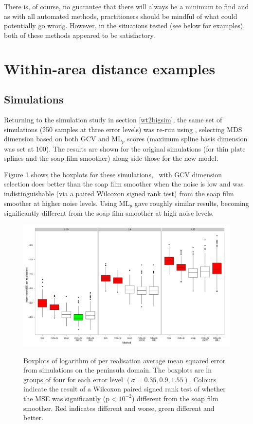 There is, of course, no guarantee that there will always be a minimum to find and as with all automated methods, practitioners should be mindful of what could potentially go wrong. However, in the situations tested (see below for examples), both of these methods appeared to be satisfactory.

\section{Within-area distance examples}
\label{gds-wad-examples}
\subsection{Simulations}

Returning to the simulation study in section \ref{wt2bigsim}, the same set of simulations (250 samples at three error levels) was re-run using \mdsds, selecting MDS dimension based on both GCV and $\text{ML}_p$ scores (maximum spline basis dimension was set at 100). The results are shown for the original simulations (for thin plate splines and the soap film smoother) along side those for the new model.

Figure \ref{wt2-boxplot-duchon} shows the boxplots for these simulations, \mdsds\ with GCV dimension selection does better than the soap film smoother when the noise is low and was indistinguishable (via a paired Wilcoxon signed rank test) from the soap film smoother at higher noise levels. Using $\text{ML}_p$ gave roughly similar results, becoming significantly different from the soap film smoother at high noise levels.

\begin{figure}
\centering
\includegraphics[width=6in]{mds/figs/wt2-boxplot-duchon.pdf} \\
\caption{Boxplots of logarithm of per realisation average mean squared error from simulations on the peninsula domain. The boxplots are in groups of four for each error level $(\sigma = 0.35, 0.9, 1.55)$. Colours indicate the result of a Wilcoxon paired signed rank test of whether the MSE was significantly (p$<10^{-2}$) different from the soap film smoother. Red indicates different and worse, green different and better.}
\label{wt2-boxplot-duchon}
\end{figure}


